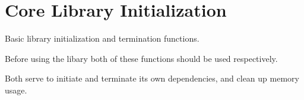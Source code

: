 \chapter{Core Library Initialization }
\hypertarget{_basics}{}\label{_basics}
Basic library initialization and termination functions.

Before using the libary both of these functions should be used respectively.
\begin{DoxyItemize}
\item {}
\item {}
\end{DoxyItemize}


\begin{DoxyCode}{0}
\DoxyCodeLine{\ \}}

\end{DoxyCode}
 Both serve to initiate and terminate its own dependencies, and clean up memory usage. 